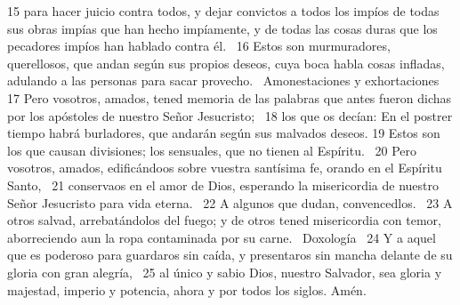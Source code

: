 15 para hacer juicio contra todos, y dejar convictos a todos los impíos de todas sus obras impías que han hecho impíamente, y de todas las cosas duras que los pecadores impíos han hablado contra él.  
16 Estos son murmuradores, querellosos, que andan según sus propios deseos, cuya boca habla cosas infladas, adulando a las personas para sacar provecho.  
Amonestaciones y exhortaciones  
17 Pero vosotros, amados, tened memoria de las palabras que antes fueron dichas por los apóstoles de nuestro Señor Jesucristo;  
18 los que os decían: En el postrer tiempo habrá burladores, que andarán según sus malvados deseos. 
19 Estos son los que causan divisiones; los sensuales, que no tienen al Espíritu.  
20 Pero vosotros, amados, edificándoos sobre vuestra santísima fe, orando en el Espíritu Santo,  
21 conservaos en el amor de Dios, esperando la misericordia de nuestro Señor Jesucristo para vida eterna.  
22 A algunos que dudan, convencedlos.  
23 A otros salvad, arrebatándolos del fuego; y de otros tened misericordia con temor, aborreciendo aun la ropa contaminada por su carne.  
Doxología  
24 Y a aquel que es poderoso para guardaros sin caída, y presentaros sin mancha delante de su gloria con gran alegría,  
25 al único y sabio Dios, nuestro Salvador, sea gloria y majestad, imperio y potencia, ahora y por todos los siglos. Amén.